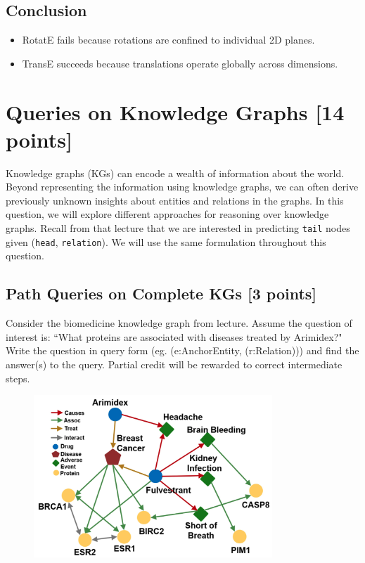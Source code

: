 \documentclass[11pt]{article}
\numberwithin{figure}{section}
\begin{document}
\subsection*{Conclusion}
\begin{itemize}
  \item RotatE fails because rotations are confined to individual 2D planes. 
  \item TransE succeeds because translations operate globally across dimensions.
\end{itemize}

\newpage

\section{Queries on Knowledge Graphs [14 points]}

Knowledge graphs (KGs) can encode a wealth of information about the world. Beyond representing the information using knowledge graphs, we can often derive previously unknown insights about entities and relations in the graphs. In this question, we will explore different approaches for reasoning over knowledge graphs. Recall from that lecture that we are interested in predicting \texttt{tail} nodes given (\texttt{head}, \texttt{relation}). We will use the same formulation throughout this question.


\subsection{Path Queries on Complete KGs [3 points]}
Consider the biomedicine knowledge graph from lecture. Assume the question of interest is: ``What proteins are associated with diseases treated by Arimidex?" Write the question in query form (eg. (e:AnchorEntity, (r:Relation))) and find the answer(s) to the query. Partial credit will be rewarded to correct intermediate steps.

\begin{figure}[H]
    \centering
    \includegraphics[width=0.8\textwidth]{CS224W_Homework2/5.1.png}
    \label{fig:5.1}
\end{figure}
\end{document}
